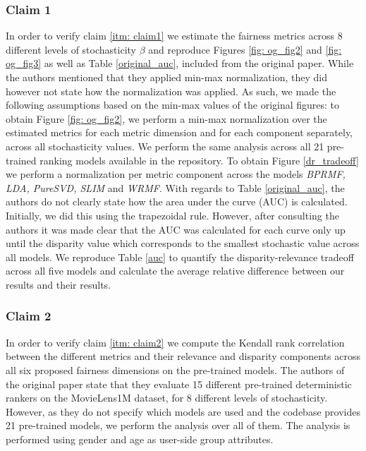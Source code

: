 \subsubsection{Claim 1} In order to verify claim \ref{itm: claim1} we estimate the fairness metrics across 8 different levels of stochasticity $\beta$ and reproduce Figures \ref{fig: og_fig2} and \ref{fig: og_fig3} as well as Table \ref{original_auc}, included from the original paper. 
While the authors mentioned that they applied min-max normalization, they did however not state how the normalization was applied. As such, we made the following assumptions based on the min-max values of the original figures: to obtain Figure \ref{fig: og_fig2}, we perform a min-max normalization over the estimated metrics for each metric dimension and for each component separately, across all stochasticity values. We perform the same analysis across all 21 pre-trained ranking models available in the repository. To obtain Figure \ref{dr_tradeoff} we perform a normalization per metric component across the models \textit{BPRMF, LDA, PureSVD, SLIM} and \textit{WRMF}. With regards to Table \ref{original_auc}, the authors do not clearly state how the area under the curve (AUC) is calculated. Initially, we did this using the trapezoidal rule. However, after consulting the authors it was made clear that the AUC was calculated for each curve only up until the disparity value which corresponds to the smallest stochastic value across all models. We reproduce Table \ref{auc} to quantify the disparity-relevance tradeoff across all five models and calculate the average relative difference between our results and their results. 

\subsubsection{Claim 2} In order to verify claim \ref{itm: claim2} we compute the Kendall rank correlation \cite{kendall_rank}  between the different metrics and their relevance and disparity components across all six proposed fairness dimensions on the pre-trained models. The authors of the original paper state that they evaluate 15 different pre-trained deterministic rankers on the MovieLens1M dataset, for 8 different levels of stochasticity. However, as they do not specify which models are used and the codebase provides 21 pre-trained models, we perform the analysis over all of them. The analysis is performed using gender and age as user-side group attributes. 

